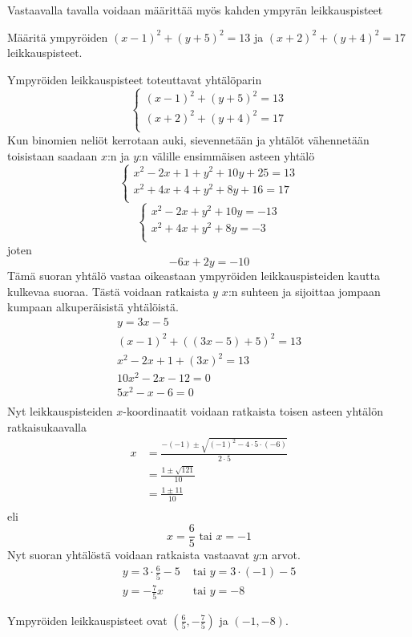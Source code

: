Vastaavalla tavalla voidaan määrittää myös kahden ympyrän leikkauspisteet

\begin{esimerkki}
Määritä ympyröiden $(x-1)^2+(y+5)^2 = 13$ ja $(x+2)^2+(y+4)^2 = 17$ leikkauspisteet.

\begin{esimratk}
Ympyröiden leikkauspisteet toteuttavat yhtälöparin
\[
\left\{    
    \begin{array}{rcl}
        (x-1)^2+(y+5)^2 = 13 \\
        (x+2)^2+(y+4)^2 = 17 \\
    \end{array}
    \right.
\]
Kun binomien neliöt kerrotaan auki, sievennetään ja yhtälöt vähennetään toisistaan saadaan $x$:n ja $y$:n välille ensimmäisen asteen yhtälö
\[
\left\{    
    \begin{array}{rcl}
        x^2-2x+1+y^2+10y+25 = 13 \\
        x^2+4x+4+y^2+8y+16 = 17 \\
    \end{array}
    \right.
\]
\[
\left\{    
    \begin{array}{rcl}
        x^2-2x+y^2+10y= -13 \\
        x^2+4x+y^2+8y= -3 \\
    \end{array}
    \right.
\]
joten
\[
-6x+2y=-10
\]
Tämä suoran yhtälö vastaa oikeastaan ympyröiden leikkauspisteiden kautta kulkevaa suoraa. Tästä voidaan ratkaista $y$ $x$:n suhteen ja sijoittaa jompaan kumpaan alkuperäisistä yhtälöistä.
\begin{align*}
y = 3x-5 \\
(x-1)^2+((3x-5)+5)^2 = 13 \\
x^2-2x+1+(3x)^2 = 13 \\
10x^2-2x-12 = 0 \\
5x^2-x-6 = 0 \\
\end{align*}
Nyt leikkauspisteiden $x$-koordinaatit voidaan ratkaista toisen asteen yhtälön ratkaisukaavalla
\begin{align*}
x &= \frac{-(-1)\pm\sqrt{(-1)^2-4\cdot 5\cdot (-6)}}{2\cdot 5} \\
&= \frac{1\pm\sqrt{121}}{10} \\
&= \frac{1\pm 11}{10} \\
\end{align*}
eli
\[
x =  \frac{6}{5} \textrm{  tai  } x = -1
\]
Nyt suoran yhtälöstä voidaan ratkaista vastaavat $y$:n arvot.
\begin{align*}
y = 3\cdot \frac{6}{5}-5 &\textrm{  tai  } y = 3\cdot (-1)-5 \\
y = -\frac{7}{5}x &\textrm{  tai  } y = -8
\end{align*}
\end{esimratk}
\begin{esimvast}
Ympyröiden leikkauspisteet ovat $(\frac{6}{5}, -\frac{7}{5})$ ja $(-1,-8)$.
\end{esimvast}
\end{esimerkki}

